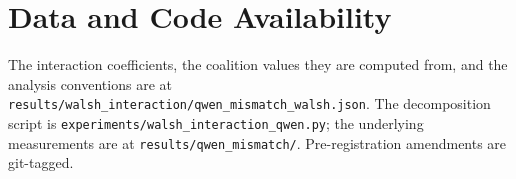 \documentclass{article}
\begin{document}
\section*{Data and Code Availability}

The interaction coefficients, the coalition values they are computed from, and the analysis conventions are at \texttt{results/walsh\_interaction/qwen\_mismatch\_walsh.json}. The decomposition script is \texttt{experiments/walsh\_interaction\_qwen.py}; the underlying measurements are at \texttt{results/qwen\_mismatch/}. Pre-registration amendments are git-tagged.



\end{document}
